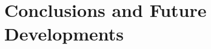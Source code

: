 \chapter{Conclusions and Future Developments}
\label{chapter7_conclusions}
\thispagestyle{empty}

\vspace{0.5cm}

% 

